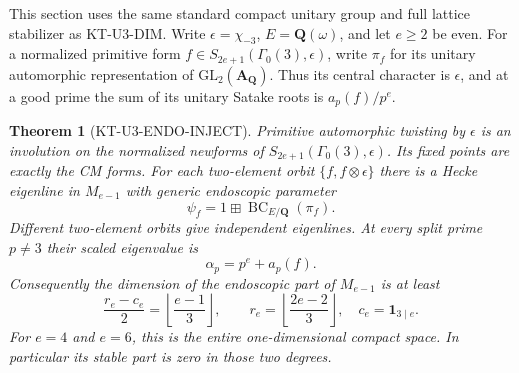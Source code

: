 \documentclass[11pt,a4paper]{article}
\newtheorem{theorem}{Theorem}[section]
\theoremstyle{definition}
\begin{document}
This section uses the same standard compact unitary group and full
lattice stabilizer as KT-U3-DIM. Write $\epsilon=\chi_{-3}$,
$E=\mathbf Q(\omega)$, and let $e\geq2$ be even.
For a normalized primitive form
$f\in S_{2e+1}(\Gamma_0(3),\epsilon)$, write $\pi_f$ for its
unitary automorphic representation of $\mathrm{GL}_2(\mathbf A_{\mathbf Q})$.
Thus its central character is $\epsilon$, and at a good prime the
sum of its unitary Satake roots is $a_p(f)/p^e$.

\begin{theorem}[KT-U3-ENDO-INJECT]
Primitive automorphic twisting by $\epsilon$ is an involution on
the normalized newforms of $S_{2e+1}(\Gamma_0(3),\epsilon)$.
Its fixed points are exactly the CM forms. For each two-element
orbit $\{f,f\otimes\epsilon\}$ there is a Hecke eigenline in
$M_{e-1}$ with generic endoscopic parameter
\[
             \psi_f=1\boxplus\operatorname{BC}_{E/\mathbf Q}(\pi_f).
\]
Different two-element orbits give independent eigenlines.
At every split prime $p\ne3$ their scaled eigenvalue is
\[
                  \alpha_p=p^e+a_p(f).                 \tag{KT-E.1}
\]
Consequently the dimension of the endoscopic part of $M_{e-1}$
is at least
\[
 \frac{r_e-c_e}{2}=\left\lfloor\frac{e-1}{3}\right\rfloor,
 \qquad
 r_e=\left\lfloor\frac{2e-2}{3}\right\rfloor,
 \quad c_e=\mathbf1_{3\mid e}.                         \tag{KT-E.2}
\]
For $e=4$ and $e=6$, this is the entire one-dimensional compact
space. In particular its stable part is zero in those two degrees.
\end{theorem}
\end{document}
